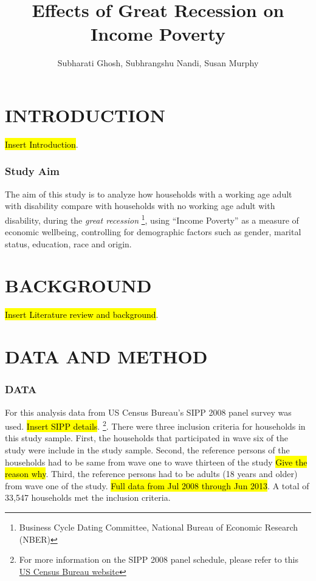 \documentclass[11pt]{extarticle} %
\begin{document}
\doublespacing


\title{Effects of Great Recession on Income Poverty}
\author{Subharati Ghosh, Subhrangshu Nandi, Susan Murphy \\
\date{}
}

\maketitle
\section*{INTRODUCTION}
{\hl{Insert Introduction}}.

\subsubsection*{Study Aim}
The aim of this study is to analyze how households with a working age adult with disability compare with households with no working age adult with disability, during the {\emph{great recession}} \footnote{Business Cycle Dating Committee, National Bureau of Economic Research (NBER)}, using ``Income Poverty'' as a measure of economic wellbeing, controlling for demographic factors such as gender, marital status, education, race and origin. 

\section*{BACKGROUND}
{\hl{Insert Literature review and background}}.

\section*{DATA AND METHOD}
\subsubsection*{DATA}
For this analysis data from US Census Bureau's SIPP 2008 panel survey was used. {\hl{Insert SIPP details}}. {\footnote{For more information on the SIPP 2008 panel schedule, please refer to this \href{http://www.census.gov/programs-surveys/sipp/data/2008-panel.html}{US Census Bureau website}}}. There were three inclusion criteria for households in this study sample. First, the households that participated in wave six of the study were include in the study sample. Second, the reference persons of the households had to be same from wave one to wave thirteen of the study {\hl{Give the reason why}}. Third, the reference persons had to be adults (18 years and older) from wave one of the study. {\hl{Full data from Jul 2008 through Jun 2013}}. A total of 33,547 households met the inclusion criteria.
\end{document}
